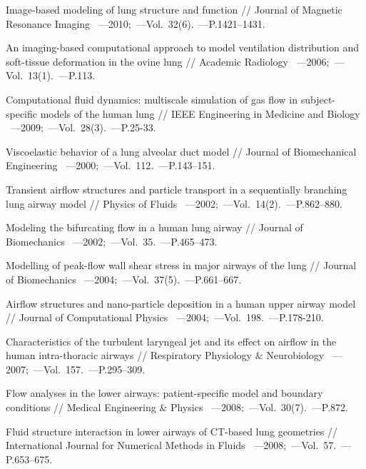 \begin{thebibliography}{}
     Image-based modeling of lung structure and function // Journal of Magnetic Resonance Imaging ~---2010;~---Vol.~32(6).~---P.1421–1431.
    
     An imaging-based computational approach to model ventilation distribution and
soft-tissue deformation in the ovine lung // Academic Radiology ~---2006;~---Vol.~13(1).~---P.113.

     Computational fluid dynamics: multiscale simulation of gas
flow in subject-specific models of the human lung // IEEE Engineering in Medicine and Biology ~---2009;~---Vol.~28(3).~---P.25-33.

     Viscoelastic behavior of a lung alveolar duct model // Journal of Biomechanical Engineering ~---2000;~---Vol.~112.~---P.143–151.
    
      Transient airflow structures and particle transport in a sequentially branching lung airway
model // Physics of Fluids ~---2002;~---Vol.~14(2).~---P.862–880.

     Modeling the bifurcating flow in a human lung airway // Journal of Biomechanics ~---2002;~---Vol.~35.~---P.465–473.
    
     Modelling of peak-flow wall shear stress in major airways of the lung // Journal of Biomechanics ~---2004;~---Vol.~37(5).~---P.661–667.
    
     Airflow structures and nano-particle deposition in a human upper airway model // Journal of
Computational Physics ~---2004;~---Vol.~198.~---P.178-210.

     Characteristics of the turbulent laryngeal jet and its effect on
airflow in the human intra-thoracic airways // Respiratory Physiology \& Neurobiology ~---2007;~---Vol.~157.~---P.295–309.

     Flow analyses in the
lower airways: patient-specific model and boundary conditions // Medical Engineering \& Physics ~---2008;~---Vol.~30(7).~---P.872.

     Fluid structure interaction in lower airways of CT-based lung geometries // International Journal
for Numerical Methods in Fluids ~---2008;~---Vol.~57.~---P.653–675.


\end{thebibliography}
